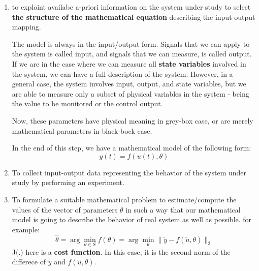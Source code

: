 \begin{enumerate}
    \item to exploint availabe a-priori information on the system under study to select \textbf{the structure of the mathematical equation} describing the input-output mapping.
    \begin{factbox}
The model is always in the input/output form. Signals that we can apply to the system is called input, and signals that we can measure, is called output. If we are in the case where we can measure all \textbf{state variables} involved in the system, we can have a full description of the system. However, in a general case, the system involves input, output, and state variables, but we are able to measure only a subset of physical variables in the system - being the value to be monitored or the control output.

Now, these parameters have physical meaning in grey-box case, or are merely mathematical parameters in black-bock case.
\end{factbox}

In the end of this step, we have a mathematical model of the following form:
\begin{equation}
y(t) = f\left( u(t), \theta\right)
\end{equation}

    \item To collect input-output data representing the behavior of the system under study by performing an experiment.
\begin{center}\end{center}
    \item To formulate a suitable mathematical problem to estimate/compute the values of the vector of parameters $\theta$ in such a way that our mathematical model is going to describe the behavior of real system as well as possible.
for example:
\[
\hat{\theta} = \arg \min\limits_{\theta \in S} f(\theta) = \arg \min\limits_{\theta} \|\tilde{y} - f(\tilde{u}, \theta)\|_2
\] 
J(.) here is a \textbf{cost function}. In this case, it is the second norm of the differece of $\tilde{y}$ and $f(\tilde{u}, \theta)$.\newline


\end{enumerate}
